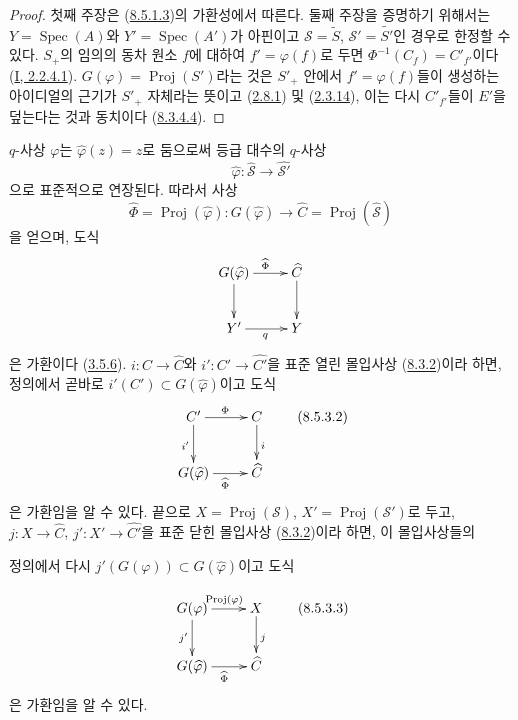 \begin{proof}
첫째 주장은 (\hyperref[II.8.5.1.3-ko]{8.5.1.3})의 가환성에서 따른다.
둘째 주장을 증명하기 위해서는
$Y=\operatorname{Spec}(A)$와 $Y'=\operatorname{Spec}(A')$가 아핀이고
$\mathcal{S}=\widetilde{S}$,
$\mathcal{S}'=\widetilde{S'}$인 경우로 한정할 수 있다. $S_+$의 임의의
동차 원소 $f$에 대하여 $f'=\varphi(f)$로 두면
$\Phi^{-1}(C_f)=C'_{f'}$이다
(\hyperref[I.2.2.4.1-ko]{I, 2.2.4.1}).
$G(\varphi)=\operatorname{Proj}(S')$라는 것은 $S'_+$ 안에서
$f'=\varphi(f)$들이 생성하는 아이디얼의 근기가 $S'_+$ 자체라는
뜻이고 (\hyperref[II.2.8.1-ko]{2.8.1}) 및
(\hyperref[II.2.3.14-ko]{2.3.14}), 이는 다시 $C'_{f'}$들이 $E'$을
덮는다는 것과 동치이다
(\hyperref[II.8.3.4.4-ko]{8.3.4.4}).
\end{proof}

\begin{env}[8.5.3]
\label{II.8.5.3-ko}
$q$-사상 $\varphi$는 $\widehat{\varphi}(z)=z$로 둠으로써 등급 대수의
$q$-사상
\begin{equation}
\label{II.8.5.3.1-ko}
  \widehat{\varphi}:\widehat{\mathcal{S}}
  \to\widehat{\mathcal{S}'}
\tag{8.5.3.1}
\end{equation}
으로 표준적으로 연장된다. 따라서 사상
\[
  \widehat{\Phi}=\operatorname{Proj}(\widehat{\varphi}):
  G(\widehat{\varphi})\to\widehat{C}
  =\operatorname{Proj}(\widehat{\mathcal{S}})
\]
을 얻으며, 도식
\[
  \xymatrix{
    G(\widehat{\varphi})\ar[r]^{\widehat{\Phi}}\ar[d] &
    \widehat{C}\ar[d]\\
    Y'\ar[r]_{q} & Y
  }
\]
은 가환이다 (\hyperref[II.3.5.6-ko]{3.5.6}).
$i:C\to\widehat{C}$와 $i':C'\to\widehat{C'}$을 표준 열린 몰입사상
(\hyperref[II.8.3.2-ko]{8.3.2})이라 하면, 정의에서 곧바로
$i'(C')\subset G(\widehat{\varphi})$이고 도식
\begin{equation}
\label{II.8.5.3.2-ko}
  \xymatrix{
    C'\ar[r]^{\Phi}\ar[d]_{i'} & C\ar[d]^{i}\\
    G(\widehat{\varphi})\ar[r]_{\widehat{\Phi}} & \widehat{C}
  }
\tag{8.5.3.2}
\end{equation}
은 가환임을 알 수 있다. 끝으로
$X=\operatorname{Proj}(\mathcal{S})$,
$X'=\operatorname{Proj}(\mathcal{S}')$로 두고,
$j:X\to\widehat{C}$, $j':X'\to\widehat{C'}$을 표준 닫힌 몰입사상
(\hyperref[II.8.3.2-ko]{8.3.2})이라 하면, 이 몰입사상들의

정의에서 다시 $j'(G(\varphi))\subset G(\widehat{\varphi})$이고 도식

\begin{equation}
\label{II.8.5.3.3-ko}
  \xymatrix{
    G(\varphi)\ar[r]^{\operatorname{Proj}(\varphi)}\ar[d]_{j'} &
    X\ar[d]^{j}\\
    G(\widehat{\varphi})\ar[r]_{\widehat{\Phi}} & \widehat{C}
  }
\tag{8.5.3.3}
\end{equation}
은 가환임을 알 수 있다.
\end{env}

